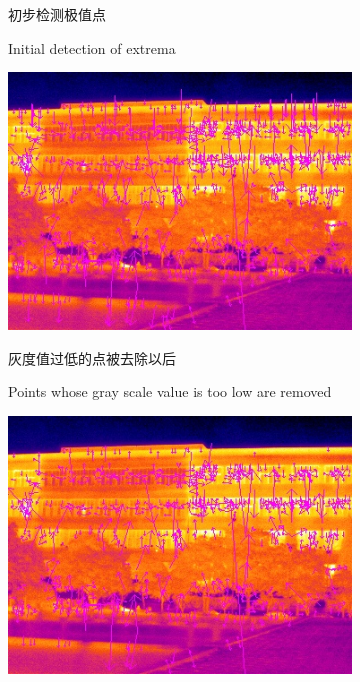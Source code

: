 \documentclass[10.5pt,a4paper]{article}
\numberwithin{equation}{section}
\numberwithin{figure}{section}
\numberwithin{table}{section}
\begin{document}
\begin{figure}[htbp]
\begin{subfigure}[b]{.4\textwidth}
				\caption{初步检测极值点\label{noContrTh}}
				\addtocounter{subfigure}{-1}
				\caption{Initial detection of extrema}
	\end{subfigure}
	\begin{subfigure}[b]{.4\textwidth}
		\centering
				\includegraphics[width=\textwidth]{useful/compareEdgeResponse/siftFeature918.jpg}
				\caption{灰度值过低的点被去除以后\label{noEdgeElimit}}
				\addtocounter{subfigure}{-1}
				\caption{Points whose gray scale value is too low are removed}
	\end{subfigure}
	\qquad
	\begin{subfigure}[b]{.4\textwidth}
		\centering
				\includegraphics[width=\textwidth]{useful/compareEdgeResponse/siftFeature792.jpg}

\end{subfigure}
\end{figure}
\end{document}
